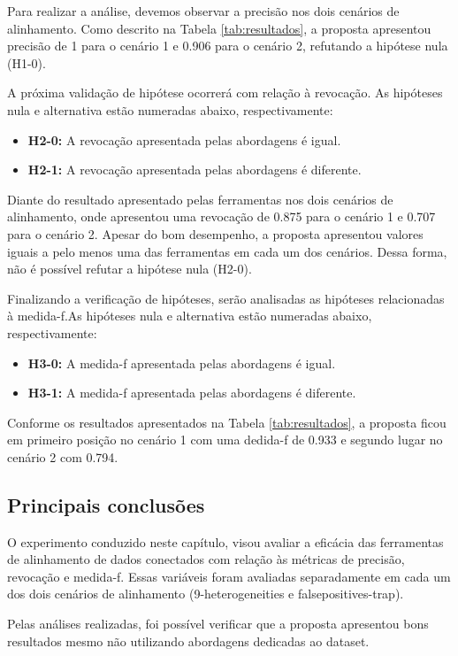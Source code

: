 Para realizar a análise, devemos observar a precisão nos dois cenários de alinhamento. Como descrito na Tabela \ref{tab:resultados}, a proposta apresentou precisão de 1 para o cenário 1 e 0.906 para o cenário 2, refutando a hipótese nula (H1-0).

A próxima validação de hipótese ocorrerá com relação à revocação. As hipóteses nula e alternativa estão numeradas abaixo, respectivamente:

\begin{itemize}
\item \textbf{H2-0:} A revocação apresentada pelas abordagens é igual.
\item \textbf{H2-1:} A revocação apresentada pelas abordagens é diferente.
\end{itemize}

Diante do resultado apresentado pelas ferramentas nos dois cenários de alinhamento, onde apresentou uma revocação de 0.875 para o cenário 1 e 0.707 para o cenário 2. Apesar do bom desempenho, a proposta apresentou valores iguais a pelo menos uma das ferramentas em cada um dos cenários. Dessa forma, não é possível refutar a hipótese nula (H2-0).

Finalizando a verificação de hipóteses, serão analisadas as hipóteses relacionadas à medida-f.As hipóteses nula e alternativa estão numeradas abaixo, respectivamente:

\begin{itemize}
\item \textbf{H3-0:} A medida-f apresentada pelas abordagens é igual.
\item \textbf{H3-1:} A medida-f apresentada pelas abordagens é diferente.
\end{itemize}

Conforme os resultados apresentados na Tabela \ref{tab:resultados}, a proposta ficou em primeiro posição no cenário 1 com uma dedida-f de 0.933 e segundo lugar no cenário 2 com 0.794.


\subsection{Principais conclusões}
O experimento conduzido neste capítulo, visou avaliar a eficácia das ferramentas de alinhamento de dados conectados com relação às métricas de precisão, revocação e medida-f. Essas variáveis foram avaliadas separadamente em cada um dos dois cenários de alinhamento (9-heterogeneities e falsepositives-trap).

Pelas análises realizadas, foi possível verificar que a proposta apresentou bons resultados mesmo não utilizando abordagens dedicadas ao dataset.
